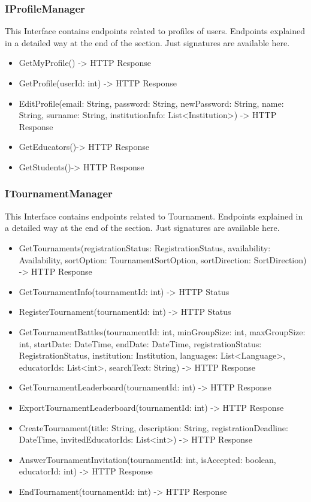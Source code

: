 \subsubsection{IProfileManager}
This Interface contains endpoints related to profiles of users. Endpoints explained in a detailed way at the end of the section. Just signatures are available here.
\begin{itemize}
\item GetMyProfile() -> HTTP Response
\item GetProfile(userId: int) -> HTTP Response
\item EditProfile(email: String, password: String, newPassword: String, name: String, surname: String, institutionInfo: List<Institution>) -> HTTP Response
\item GetEducators()-> HTTP Response
\item GetStudents()-> HTTP Response
\end{itemize}
\subsubsection{ITournamentManager}
This Interface contains endpoints related to Tournament. Endpoints explained in a detailed way at the end of the section. Just signatures are available here.
\begin{itemize}
\item GetTournaments(registrationStatus: RegistrationStatus, availability: Availability, sortOption: TournamentSortOption, sortDirection: SortDirection) -> HTTP Response
\item GetTournamentInfo(tournamentId: int) -> HTTP Status
\item RegisterTournament(tournamentId: int) -> HTTP Status
\item GetTournamentBattles(tournamentId: int, minGroupSize: int, maxGroupSize: int, startDate: DateTime, endDate: DateTime, registrationStatus: RegistrationStatus, institution: Institution, languages: List<Language>, educatorIds: List<int>, searchText: String) -> HTTP Response
\item GetTournamentLeaderboard(tournamentId: int) -> HTTP Response
\item ExportTournamentLeaderboard(tournamentId: int) -> HTTP Response
\item CreateTournament(title: String, description: String, registrationDeadline: DateTime, invitedEducatorIds: List<int>) -> HTTP Response
\item AnswerTournamentInvitation(tournamentId: int, isAccepted: boolean, educatorId: int) -> HTTP Response
\item EndTournament(tournamentId: int) -> HTTP Response
\end{itemize}

